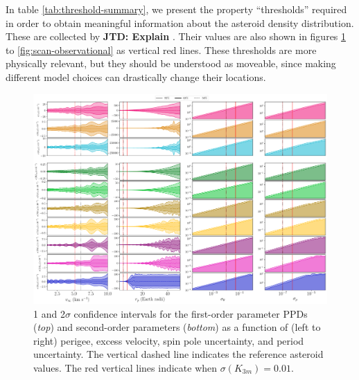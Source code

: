 \documentclass[fleqn,usenatbib]{mnras}
\newcommand{\jtd}[1]{ {\bf{\color{red} JTD: #1}} }
\begin{document}
In table \ref{tab:threshold-summary}, we present the property ``thresholds'' required in order to obtain meaningful information about the asteroid density distribution. These are collected by \jtd{Explain}. Their values are also shown in figures \ref{fig:scan-physical} to \ref{fig:scan-observational} as vertical red lines. These thresholds are more physically relevant, but they should be understood as moveable, since making different model choices can drastically change their locations.

\begin{figure}
  \newpage
  \centering
  \includegraphics[angle=90, origin=c, width=\linewidth]{figs/scan-all1.pdf}
  \caption{1 and 2$\sigma$ confidence intervals for the first-order parameter PPDs (\textit{top}) and second-order parameters (\textit{bottom}) as a function of (left to right) perigee, excess velocity, spin pole uncertainty, and period uncertainty. The vertical dashed line indicates the reference asteroid values. The red vertical lines indicate when $\sigma(K_{3m}) =0.01$.}
  \label{fig:scan-perigee}
  \label{fig:scan-vex}
  \label{fig:scan-am}
  \label{fig:scan-period}
  \label{fig:scan-physical}
\end{figure}
\end{document}
